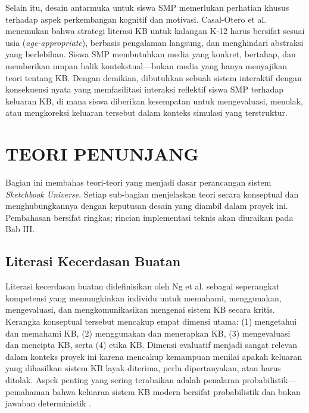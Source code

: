 \documentclass[12pt,a4paper,oneside,openany]{report}
\begin{document}
Selain itu, desain antarmuka untuk siswa SMP memerlukan perhatian khusus terhadap aspek perkembangan kognitif dan motivasi. Casal-Otero et al. \cite{ref2} menemukan bahwa strategi literasi KB untuk kalangan K-12 harus bersifat sesuai usia (\textit{age-appropriate}), berbasis pengalaman langsung, dan menghindari abstraksi yang berlebihan. Siswa SMP membutuhkan media yang konkret, bertahap, dan memberikan umpan balik kontekstual---bukan media yang hanya menyajikan teori tentang KB. Dengan demikian, dibutuhkan sebuah sistem interaktif dengan konsekuensi nyata yang memfasilitasi interaksi reflektif siswa SMP terhadap keluaran KB, di mana siswa diberikan kesempatan untuk mengevaluasi, menolak, atau mengkoreksi keluaran tersebut dalam konteks simulasi yang terstruktur.

\section{TEORI PENUNJANG}
\label{sec:teori-penunjang}

Bagian ini membahas teori-teori yang menjadi dasar perancangan sistem \textit{Sketchbook Universe}. Setiap sub-bagian menjelaskan teori secara konseptual dan menghubungkannya dengan keputusan desain yang diambil dalam proyek ini. Pembahasan bersifat ringkas; rincian implementasi teknis akan diuraikan pada Bab III.

\subsection{Literasi Kecerdasan Buatan}
\label{subsec:literasi-kb}

Literasi kecerdasan buatan didefinisikan oleh Ng et al. \cite{ref1} sebagai seperangkat kompetensi yang memungkinkan individu untuk memahami, menggunakan, mengevaluasi, dan mengkomunikasikan mengenai sistem KB secara kritis. Kerangka konseptual tersebut mencakup empat dimensi utama: (1) mengetahui dan memahami KB, (2) menggunakan dan menerapkan KB, (3) mengevaluasi dan mencipta KB, serta (4) etika KB. Dimensi evaluatif menjadi sangat relevan dalam konteks proyek ini karena mencakup kemampuan menilai apakah keluaran yang dihasilkan sistem KB layak diterima, perlu dipertanyakan, atau harus ditolak. Aspek penting yang sering terabaikan adalah penalaran probabilistik---pemahaman bahwa keluaran sistem KB modern bersifat probabilistik dan bukan jawaban deterministik \cite{ref1}\cite{ref2}.
\end{document}
